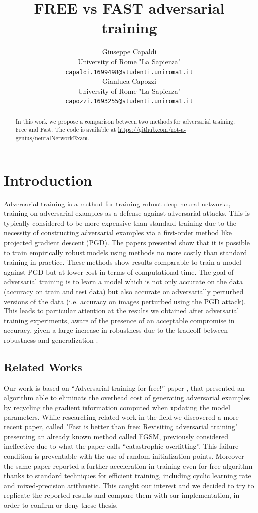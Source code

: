 \documentclass{article}
\title{FREE vs FAST adversarial training}
\author{
	Giuseppe Capaldi\\
	University of Rome "La Sapienza"\\
	\texttt{capaldi.1699498@studenti.uniroma1.it}\\
	\And
	Gianluca Capozzi\\
	University of Rome "La Sapienza"\\
	\texttt{capozzi.1693255@studenti.uniroma1.it}\\
}
\begin{document}
\maketitle

\begin{abstract}
In this work we propose a comparison between two methods for adversarial training: Free and Fast. The code is available at \url{https://github.com/not-a-genius/neuralNetworkExam}.
\end{abstract}

\section{Introduction}
Adversarial training is a method for training robust deep neural networks, training on adversarial examples as a defense against adversarial attacks. This is typically considered to be more expensive than standard training due to the necessity of constructing adversarial examples via a first-order method like projected gradient descent (PGD). The papers presented show that it is possible to train empirically robust models using methods no more costly than standard training in practice.
These methods show results comparable to train a model against PGD but at lower cost in terms of computational time.
The goal of adversarial training is to learn a model which is not only accurate on the data (accuracy on train and test data) but also accurate on adversarially perturbed versions of the data (i.e. accuracy on images perturbed using the PGD attack).  
This leads to particular attention at the results we obtained after adversarial training experiments, aware of the presence of an acceptable compromise in accuracy, given a large increase in robustness due to the tradeoff between robustness and generalization \cite{TsiprasEtAl, ZhangEtAl2019a, ShafahiEtAl2019a}.

\subsection{Related Works}
Our work is based on “Adversarial training for free!” paper \cite{ShafahiEtAl2019b}, that presented an algorithm able to eliminate the overhead cost of generating adversarial examples by recycling the gradient information computed when updating the model parameters. While researching related work in the field we discovered a more recent paper, called "Fast is better than free: Revisiting adversarial training" \cite{WongEtAl2020} presenting an already known method called FGSM, previously considered ineffective due to what the paper calls “catastrophic overfitting”. This failure condition is preventable with the use of random initialization points. Moreover the same paper reported a further acceleration in training even for free algorithm thanks to standard techniques for efficient training, including cyclic learning rate and mixed-precision arithmetic.
This caught our interest and we decided to try to replicate the reported results and compare them with our implementation, in order to confirm or deny these thesis.
\end{document}
